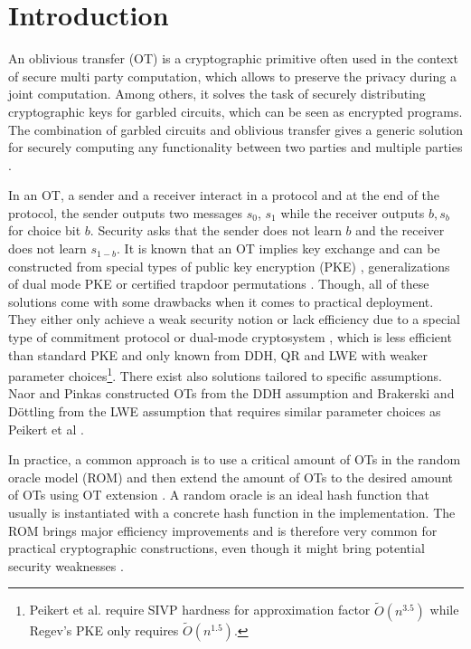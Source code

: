\newcommand{\msng}{\textcolor{red}{(Missing References?)}}

\section{Introduction}

An oblivious transfer (OT) \cite{Rabin81,C:EveGolLem82} is a cryptographic primitive often used in the context of secure multi party computation, which allows to preserve the privacy during a joint computation. Among others, it solves the task of securely distributing cryptographic keys for garbled circuits, which can be seen as encrypted programs. The combination of garbled circuits and oblivious transfer gives a generic solution for securely computing any functionality between two parties \cite{FOCS:Yao82b,FOCS:Yao86,STOC:Kilian88,C:IshPraSah08,EC:IKOPS11} and multiple parties \cite{C:CreVanTap95,EC:BenLin18,EC:GarSri18a}.   


In an OT, a sender and a receiver interact in a protocol and at the end of the protocol, the sender outputs two messages $s_0$, $s_1$ while the receiver outputs $b, s_b$ for choice bit $b$. Security asks that the sender does not learn $b$ and the receiver does not learn $s_{1-b}$. It is known that an OT implies key exchange and can be constructed from special types of public key encryption (PKE) \cite{FOCS:GKMRV00,C:PeiVaiWat08,cryptoeprint:2018:473}, generalizations of dual mode PKE \cite{TCC:GarIshSri18} or certified trapdoor permutations \cite{C:OstRicSca15}. Though, all of these solutions come with some drawbacks when it comes to practical deployment. They either only achieve a weak security notion \cite{FOCS:GKMRV00} or lack efficiency due to a special type of commitment protocol \cite{STOC:Kilian92,C:OstRicSca15,cryptoeprint:2018:473} or dual-mode cryptosystem \cite{C:PeiVaiWat08, TCC:GarIshSri18}, which is less efficient than standard PKE and only known from DDH, QR and LWE with weaker parameter choices\footnote{Peikert et al. require SIVP hardness for approximation factor $\tilde{O}(n^{3.5})$ while Regev's PKE \cite{STOC:Regev05} only requires $\tilde{O}(n^{1.5})$.}. There exist also solutions tailored to specific assumptions. Naor and Pinkas \cite{SODA:NaoPin01} constructed OTs from the DDH assumption and Brakerski and D\"ottling \cite{TCC:BraDot18} from the LWE assumption that requires similar parameter choices as Peikert et al \cite{C:PeiVaiWat08}.

In practice, a common approach is to use a critical amount of OTs in the random oracle model (ROM) \cite{CCS:BelRog93} and then extend the amount of OTs to the desired amount of OTs using OT extension \cite{STOC:Beaver96a,C:IKNP03,RSA:OrrOrsSch17,EC:ALSZ15,C:KelOrsSch15}. A random oracle is an ideal hash function that usually is instantiated with a concrete hash function in the implementation. The ROM brings major efficiency improvements and is therefore very common for practical cryptographic constructions, even though it might bring potential security weaknesses \cite{STOC:CanGolHal98}. 

